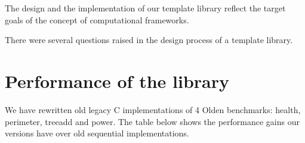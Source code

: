 \quad The design and the implementation of our template library reflect the target goals of the concept of computational frameworks.    

\quad There were several questions raised in the design process of a template library. 

\section{Performance of the library}
\quad We have rewritten old legacy C implementations of 4 Olden benchmarks: health, perimeter, treeadd and power. The table below shows the performance gains our versions have over old sequential implementations.   




